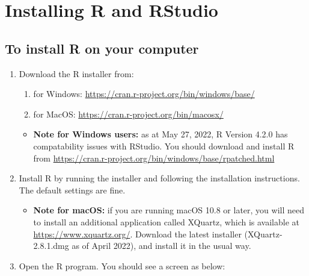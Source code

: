 \documentclass[
]{memoir}
\providecommand{\tightlist}{%
  \setlength{\itemsep}{0pt}\setlength{\parskip}{0pt}}
\begin{document}
\hypertarget{installing-r-and-rstudio}{%
\section{Installing R and RStudio}\label{installing-r-and-rstudio}}

\hypertarget{to-install-r-on-your-computer}{%
\subsection{To install R on your computer}\label{to-install-r-on-your-computer}}

\begin{enumerate}
\def\labelenumi{\arabic{enumi}.}
\item
  Download the R installer from:

  \begin{enumerate}
  \def\labelenumii{\alph{enumii}.}
  \tightlist
  \item
    for Windows: \url{https://cran.r-project.org/bin/windows/base/}
  \item
    for MacOS: \url{https://cran.r-project.org/bin/macosx/}
  \end{enumerate}

  \begin{itemize}
  \tightlist
  \item
    \textbf{Note for Windows users:} as at May 27, 2022, R Version 4.2.0 has compatability issues with RStudio. You should download and install R from \url{https://cran.r-project.org/bin/windows/base/rpatched.html}
  \end{itemize}
\item
  Install R by running the installer and following the installation instructions. The default settings are fine.

  \begin{itemize}
  \tightlist
  \item
    \textbf{Note for macOS:} if you are running macOS 10.8 or later, you will need to install an additional application called XQuartz, which is available at \url{https://www.xquartz.org/}. Download the latest installer (XQuartz-2.8.1.dmg as of April 2022), and install it in the usual way.
  \end{itemize}
\item
  Open the R program. You should see a screen as below:
\end{enumerate}
\end{document}
